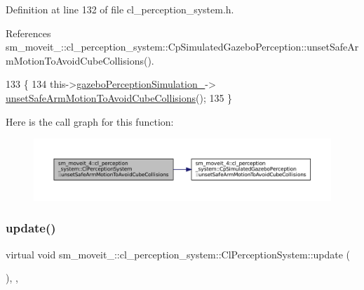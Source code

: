 Definition at line 132 of file cl\+\_\+perception\+\_\+system.\+h.



References sm\+\_\+moveit\+\_\+::cl\+\_\+perception\+\_\+system\+::\+Cp\+Simulated\+Gazebo\+Perception\+::unset\+Safe\+Arm\+Motion\+To\+Avoid\+Cube\+Collisions().


\begin{DoxyCode}
133             \{
134                 this->\hyperlink{classsm__moveit__4_1_1cl__perception__system_1_1ClPerceptionSystem_a027c07df3f1a2cc0c30be111b27dbe5c}{gazeboPerceptionSimulation\_}->
      \hyperlink{classsm__moveit__4_1_1cl__perception__system_1_1CpSimulatedGazeboPerception_a7f5d68f2ff7dd0ade9756058e790efa1}{unsetSafeArmMotionToAvoidCubeCollisions}();
135             \}
\end{DoxyCode}
Here is the call graph for this function\+:
\nopagebreak
\begin{figure}[H]
\begin{center}
\leavevmode
\includegraphics[width=350pt]{classsm__moveit__4_1_1cl__perception__system_1_1ClPerceptionSystem_ab8bbe4be37d763fde0e67e9edd33b83a_cgraph}
\end{center}
\end{figure}
\mbox{\label{classsm__moveit__4_1_1cl__perception__system_1_1ClPerceptionSystem_a91de8cf71c93738f8bcbea388c84a5dd}} 
\subsubsection{\texorpdfstring{update()}{update()}}
{\footnotesize\ttfamily virtual void sm\+\_\+moveit\+\_\+::cl\+\_\+perception\+\_\+system\+::\+Cl\+Perception\+System\+::update (\begin{DoxyParamCaption}{ }\end{DoxyParamCaption})\hspace{0.3cm}{\ttfamily [inline]}, {\ttfamily [override]}, {\ttfamily [virtual]}}



